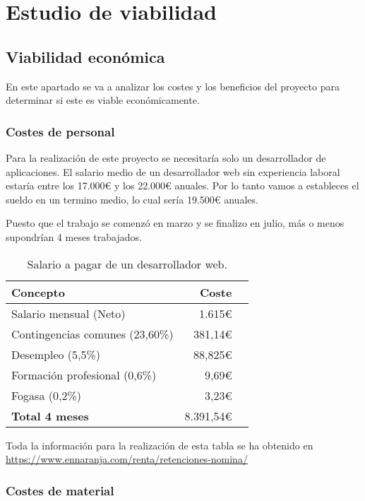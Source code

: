 \section{Estudio de viabilidad}

\subsection{Viabilidad económica}

En este apartado se va a analizar los costes y los beneficios del proyecto para determinar si este es viable económicamente.

\subsubsection{Costes de personal}

Para la realización de este proyecto se necesitaría solo un desarrollador de aplicaciones. El salario medio de un desarrollador web sin experiencia laboral estaría entre los 17.000€ y los 22.000€ anuales. Por lo tanto vamos a estableces el sueldo en un termino medio, lo cual sería 19.500€ anuales.

Puesto que el trabajo se comenzó en marzo y se finalizo en julio, más o menos supondrían 4 meses trabajados.

\begin{table}[H]
	 \begin{tabularx}{\linewidth}{X r r}
	 	\toprule \textbf{Concepto} & \textbf{Coste} \\
	 	\toprule
        Salario mensual (Neto) &  1.615€\\
        Contingencias comunes (23,60\%) & 381,14€ \\
        Desempleo (5,5\%) & 88,825€\\
        Formación profesional (0,6\%) & 9,69€\\
        Fogasa (0,2\%) & 3,23€   \\
        \midrule
	    \textbf{Total 4 meses} & 8.391,54€  \\
	 	\bottomrule
	 \end{tabularx}
	 \caption{Salario a pagar de un desarrollador web.}
\end{table}

Toda la información para la realización de esta tabla se ha obtenido en \href{https://www.ennaranja.com/renta/retenciones-nomina/}{https://www.ennaranja.com/renta/retenciones-nomina/}
\newpage

\subsubsection{Costes de material}

